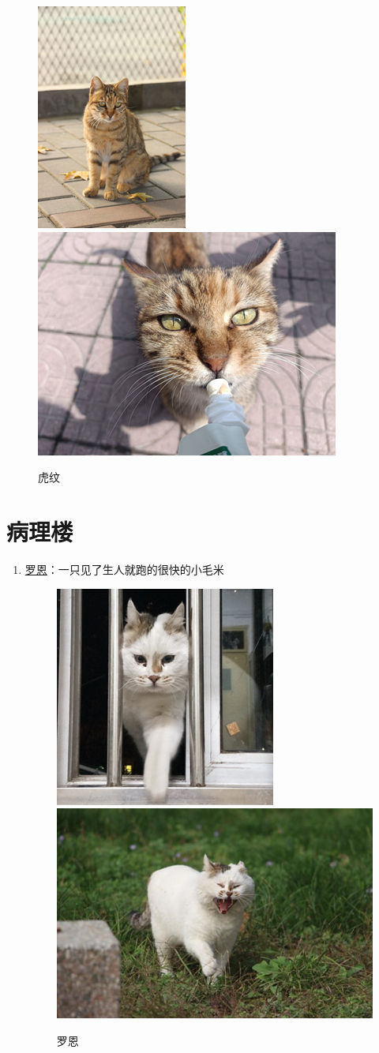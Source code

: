 \documentclass[zihao=-4,fontset=none]{Beautybook-CN}
\begin{document}
\begin{enumerate}
\begin{figure}[htbp]
            \centering
            \includegraphics[width=0.4\linewidth]{media/cimage34.png}
        \qquad
            \includegraphics[width=0.4\linewidth]{media/cimage35.png}
            \caption{虎纹}
            \label{img3435}
    \end{figure}
    \end{enumerate}
\section{病理楼}
\begin{enumerate}
    \item \hyperref[img3637]{罗恩}：一只见了生人就跑的很快的小毛米
    \begin{figure}[htbp]
            \centering
            \includegraphics[width=0.4\linewidth]{media/cimage36.png}
        \qquad
            \includegraphics[width=0.4\linewidth]{media/cimage37.png}
            \caption{罗恩}
            \label{img3637}
    \end{figure}
    \end{enumerate}
\end{document}
